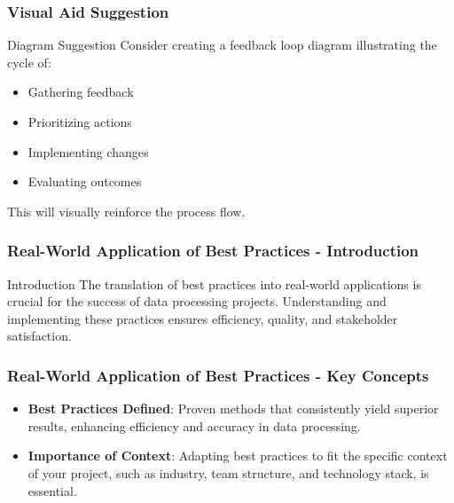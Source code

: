 \documentclass[aspectratio=169]{beamer}
\begin{document}
\begin{frame}[fragile]
    \frametitle{Visual Aid Suggestion}
    \begin{block}{Diagram Suggestion}
        Consider creating a feedback loop diagram illustrating the cycle of:
        \begin{itemize}
            \item Gathering feedback
            \item Prioritizing actions
            \item Implementing changes
            \item Evaluating outcomes
        \end{itemize}
        This will visually reinforce the process flow.
    \end{block}
\end{frame}

\begin{frame}[fragile]
    \frametitle{Real-World Application of Best Practices - Introduction}
    \begin{block}{Introduction}
        The translation of best practices into real-world applications is crucial for the success of data processing projects. 
        Understanding and implementing these practices ensures efficiency, quality, and stakeholder satisfaction.
    \end{block}
\end{frame}

\begin{frame}[fragile]
    \frametitle{Real-World Application of Best Practices - Key Concepts}
    \begin{itemize}
        \item \textbf{Best Practices Defined}: Proven methods that consistently yield superior results, enhancing efficiency and accuracy in data processing.
        
        \item \textbf{Importance of Context}: Adapting best practices to fit the specific context of your project, such as industry, team structure, and technology stack, is essential.
    \end{itemize}
\end{frame}
\end{document}
